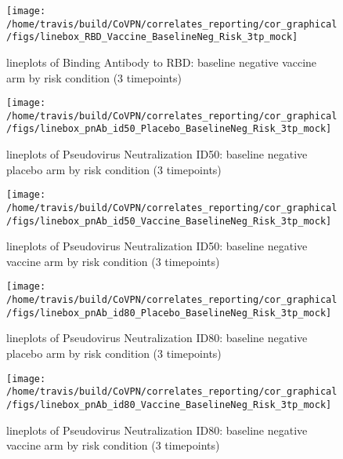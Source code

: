 \documentclass[]{book}
\theoremstyle{definition}
\theoremstyle{definition}
\theoremstyle{definition}
\newcommand{\1}{\mathbbm{1}}
\begin{document}
\clearpage
\begin{figure}[H]

{\centering \texttt{[image: /home/travis/build/CoVPN/correlates\_reporting/cor\_graphical/figs/linebox\_RBD\_Vaccine\_BaselineNeg\_Risk\_3tp\_mock]} 

}

\caption{lineplots of Binding Antibody to RBD: baseline negative vaccine arm by risk condition (3 timepoints)}\label{fig:unnamed-chunk-110}
\end{figure}

\clearpage
\begin{figure}[H]

{\centering \texttt{[image: /home/travis/build/CoVPN/correlates\_reporting/cor\_graphical/figs/linebox\_pnAb\_id50\_Placebo\_BaselineNeg\_Risk\_3tp\_mock]} 

}

\caption{lineplots of Pseudovirus Neutralization ID50: baseline negative placebo arm by risk condition (3 timepoints)}\label{fig:unnamed-chunk-111}
\end{figure}

\clearpage
\begin{figure}[H]

{\centering \texttt{[image: /home/travis/build/CoVPN/correlates\_reporting/cor\_graphical/figs/linebox\_pnAb\_id50\_Vaccine\_BaselineNeg\_Risk\_3tp\_mock]} 

}

\caption{lineplots of Pseudovirus Neutralization ID50: baseline negative vaccine arm by risk condition (3 timepoints)}\label{fig:unnamed-chunk-112}
\end{figure}

\clearpage
\begin{figure}[H]

{\centering \texttt{[image: /home/travis/build/CoVPN/correlates\_reporting/cor\_graphical/figs/linebox\_pnAb\_id80\_Placebo\_BaselineNeg\_Risk\_3tp\_mock]} 

}

\caption{lineplots of Pseudovirus Neutralization ID80: baseline negative placebo arm by risk condition (3 timepoints)}\label{fig:unnamed-chunk-113}
\end{figure}

\clearpage
\begin{figure}[H]

{\centering \texttt{[image: /home/travis/build/CoVPN/correlates\_reporting/cor\_graphical/figs/linebox\_pnAb\_id80\_Vaccine\_BaselineNeg\_Risk\_3tp\_mock]} 

}

\caption{lineplots of Pseudovirus Neutralization ID80: baseline negative vaccine arm by risk condition (3 timepoints)}\label{fig:unnamed-chunk-114}
\end{figure}
\end{document}
